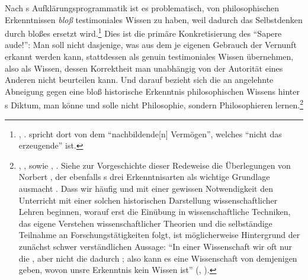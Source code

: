Nach s Aufklärungsprogrammatik ist es problematisch, von
philosophischen Erkenntnissen \emph{bloß} testimoniales Wissen zu haben, weil dadurch
das Selbstdenken durch bloßes  ersetzt
wird.\footnote{\cite[Vgl.][B 864]{Kant:KritikderreinenVernunft2003},
\cite[][III: 541.8]{Kant:GesammelteWerke1900ff.}.  spricht
dort von dem \enquote{nachbildende[n] Vermögen}, welches \enquote{nicht das
erzeugende} ist.} Dies ist die primäre Konkretisierung des \enquote{Sapere
aude!}: Man soll nicht dasjenige, was aus dem je eigenen Gebrauch der Vernunft
erkannt werden kann, stattdessen als genuin testimoniales Wissen übernehmen,
also als Wissen, dessen Korrektheit man unabhängig von der Autorität eines
Anderen nicht beurteilen kann. Und darauf bezieht sich die an
 angelehnte Abneigung gegen eine bloß historische Erkenntnis philosophischen Wissens hinter s
Diktum, man könne und solle nicht Philosophie, sondern Philosophieren
lernen.\footnote{\cite[Vgl.][A~5]{Kant:NachrichtvonderEinrichtungseinerVorlesungenindemWinterhalbenjahrevon1765-17661900ff.},
\cite[][II: 306.30--32]{Kant:GesammelteWerke1900ff.}, sowie
\cite[][B~865]{Kant:KritikderreinenVernunft2003}, \cite[][III:
541.34--542.2]{Kant:GesammelteWerke1900ff.}. Siehe zur Vorgeschichte dieser
Redeweise die Überlegungen von Norbert
\textcite[][]{Hinske:UrspruenglicheEinsichtundVersteinerung1995}, der
ebenfalls
s drei
Erkenntnisarten als wichtige Grundlage ausmacht
\parencite[vgl.][19--23]{Hinske:UrspruenglicheEinsichtundVersteinerung1995}.
Dass wir häufig und mit einer gewissen Notwendigkeit den Unterricht mit einer
solchen historischen Darstellung wissenschaftlicher Lehren beginnen, worauf erst
die Einübung in wissenschaftliche Techniken, das eigene Verstehen
wissenschaftlicher Theorien und die selbständige Teilnahme an
Forschungstätigkeiten folgt, ist möglicherweise Hintergrund der zunächst schwer
verständlichen Aussage: \enquote{In einer Wissenschaft  wir oft nur
die , aber nicht die dadurch
; also kann es eine Wissenschaft von demjenigen geben,
wovon unsre Erkenntnis kein Wissen ist}
(\cite[][A~110]{Kant:ImmanuelKantsLogik1977}, \cite[][IX:
72.8--10]{Kant:GesammelteWerke1900ff.}).}

